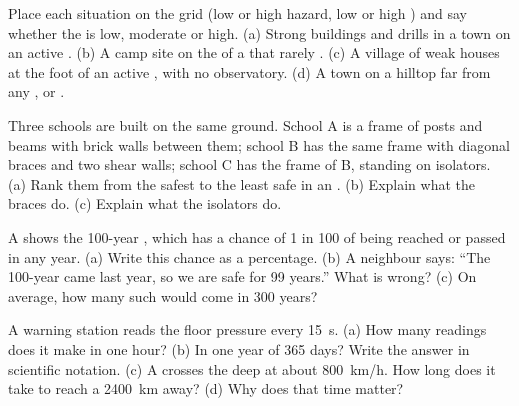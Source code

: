 \begin{exercise}[$\star\star$]\label{exo:g9:natural-risks:7}
Place each situation on the  grid (low or high hazard, low or high
) and say whether the  is low, moderate or high.
(a) Strong buildings and drills in a town on an active . (b) A
camp site on the  of a  that rarely . (c) A village
of weak houses at the foot of an active , with no observatory.
(d) A town on a hilltop far from any ,  or .
\end{exercise}

\begin{exercise}[$\star\star$]\label{exo:g9:natural-risks:8}
Three schools are built on the same ground. School A is a frame of posts
and beams with brick walls between them; school B has the same frame
with diagonal braces and two shear walls; school C has the frame of B,
standing on isolators. (a) Rank them from the safest to the least safe
in an . (b) Explain what the braces do. (c) Explain what the
isolators do.
\end{exercise}

\begin{exercise}[$\star\star$]\label{exo:g9:natural-risks:9}
A   shows the 100-year , which has a chance of 1 in 100 of
being reached or passed in any year. (a) Write this chance as a
percentage. (b) A neighbour says: ``The 100-year  came last year,
so we are safe for 99 years.'' What is wrong? (c) On average, how many
such  would come in 300 years?
\end{exercise}

\begin{exercise}[$\star\star$]\label{exo:g9:natural-risks:10}
A  warning station reads the  floor pressure every
\qty{15}{s}. (a) How many readings does it make in one hour? (b) In one
year of 365 days? Write the answer in scientific notation. (c) A 
crosses the deep  at about \qty{800}{km/h}. How long does it take to
reach a  \qty{2400}{km} away? (d) Why does that time matter?
\end{exercise}

